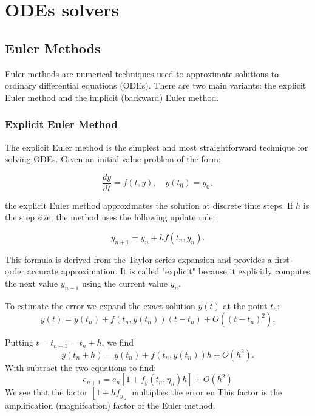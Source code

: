 \documentclass[a4paper,12pt,french]{article}
\begin{document}



\section{ODEs solvers}
\subsection{Euler Methods}
Euler methods \cite{lakoba2012simple} are numerical techniques used to approximate solutions to ordinary differential equations (ODEs). There are two main variants: the explicit Euler method and the implicit (backward) Euler method.
\subsubsection{Explicit Euler Method}
The explicit Euler method is the simplest and most straightforward technique for solving ODEs. Given an initial value problem of the form:

\[
\frac{dy}{dt} = f(t, y), \quad y(t_0) = y_0,
\]

the explicit Euler method approximates the solution at discrete time steps. If \(h\) is the step size, the method uses the following update rule:

\[
y_{n+1} = y_n + h f(t_n, y_n).
\]

This formula is derived from the Taylor series expansion and provides a first-order accurate approximation. It is called "explicit" because it explicitly computes the next value \(y_{n+1}\) using the current value \(y_n\).

To estimate the error we expand the exact solution $y(t)$ at the point $t_n$:
$$
y(t) = y(t_n) + f(t_n, y(t_n))(t - t_n) + O((t - t_n)^2).
$$

Putting $t = t_{n+1} = t_n + h$, we find
$$
y(t_n + h) = y(t_n) + f(t_n, y(t_n))h + O(h^2).$$
With subtract the two equations to find:
$$
e_{n+1} = e_n[1 + f_y(t_n, \eta_n)h] + O(h^2)
$$
We see that the factor $[1 + h f_y]$ multiplies the error en This factor
is the amplification (magnifcation) factor of the Euler method. 
\end{document}
